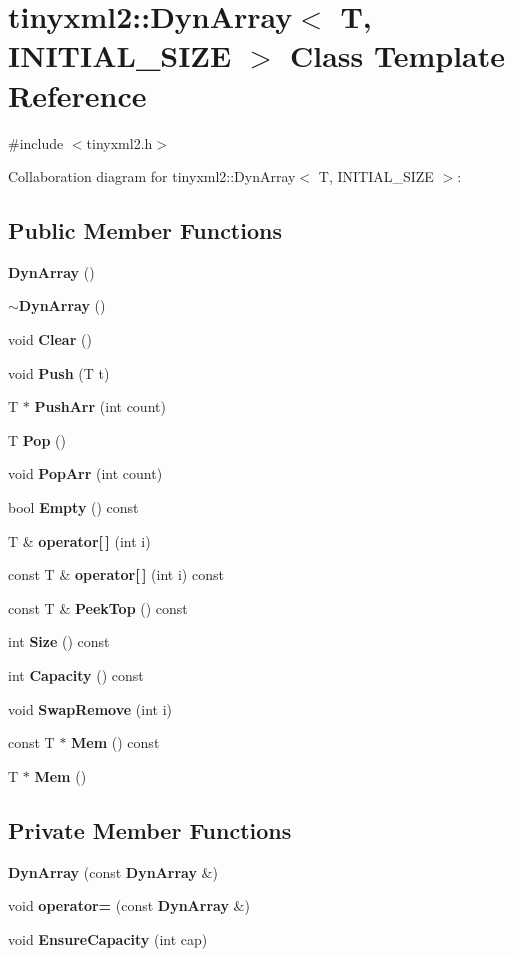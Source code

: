 \section{tinyxml2\+:\+:Dyn\+Array$<$ T, I\+N\+I\+T\+I\+A\+L\+\_\+\+S\+I\+ZE $>$ Class Template Reference}
\label{classtinyxml2_1_1_dyn_array}


{\ttfamily \#include $<$tinyxml2.\+h$>$}



Collaboration diagram for tinyxml2\+:\+:Dyn\+Array$<$ T, I\+N\+I\+T\+I\+A\+L\+\_\+\+S\+I\+ZE $>$\+:
\subsection*{Public Member Functions}
\begin{DoxyCompactItemize}
\item 
\textbf{ Dyn\+Array} ()
\item 
\textbf{ $\sim$\+Dyn\+Array} ()
\item 
void \textbf{ Clear} ()
\item 
void \textbf{ Push} (T t)
\item 
T $\ast$ \textbf{ Push\+Arr} (int count)
\item 
T \textbf{ Pop} ()
\item 
void \textbf{ Pop\+Arr} (int count)
\item 
bool \textbf{ Empty} () const
\item 
T \& \textbf{ operator[$\,$]} (int i)
\item 
const T \& \textbf{ operator[$\,$]} (int i) const
\item 
const T \& \textbf{ Peek\+Top} () const
\item 
int \textbf{ Size} () const
\item 
int \textbf{ Capacity} () const
\item 
void \textbf{ Swap\+Remove} (int i)
\item 
const T $\ast$ \textbf{ Mem} () const
\item 
T $\ast$ \textbf{ Mem} ()
\end{DoxyCompactItemize}
\subsection*{Private Member Functions}
\begin{DoxyCompactItemize}
\item 
\textbf{ Dyn\+Array} (const \textbf{ Dyn\+Array} \&)
\item 
void \textbf{ operator=} (const \textbf{ Dyn\+Array} \&)
\item 
void \textbf{ Ensure\+Capacity} (int cap)
\end{DoxyCompactItemize}
